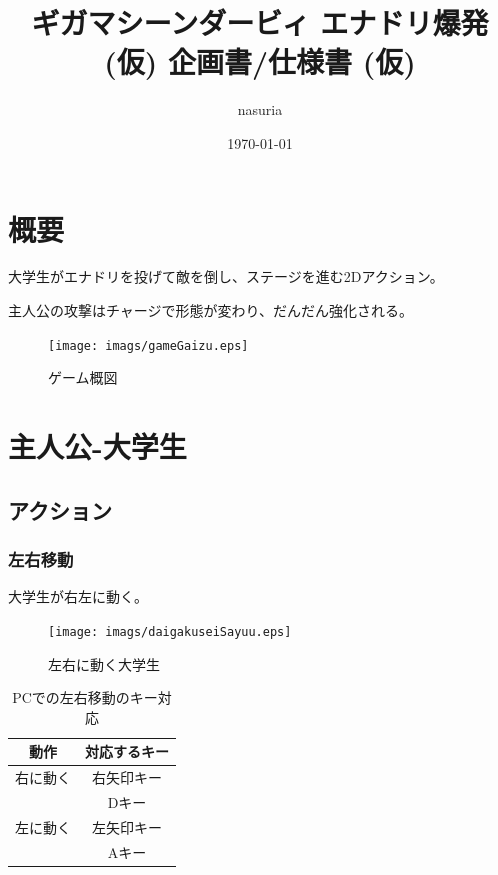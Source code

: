 \documentclass[12pt]{jsarticle}
\begin{document}
\title{
  ギガマシーンダービィ \linebreak{}
  エナドリ爆発 (仮) \linebreak{}
  企画書/仕様書 (仮)
}
\author{nasuria}
\date{\today}
\maketitle
\newpage

\tableofcontents
\newpage


\section{概要}
大学生がエナドリを投げて敵を倒し、ステージを進む2Dアクション。

主人公の攻撃はチャージで形態が変わり、だんだん強化される。

\begin{figure}[htbp]
  \begin{center}
    \texttt{[image: imags/gameGaizu.eps]}
    \caption{ゲーム概図}
  \end{center}
\end{figure}

\newpage

\section{主人公-大学生}
\subsection{アクション}
\subsubsection{左右移動}

大学生が右左に動く。

\begin{figure}[htbp]
  \begin{center}
    \texttt{[image: imags/daigakuseiSayuu.eps]}
    \caption{左右に動く大学生}
  \end{center}
\end{figure}

\begin{table}[htbp]
  \centering
  \caption{PCでの左右移動のキー対応}
  \begin{tabular}{cc}
    \toprule
    動作 & 対応するキー \\
    \midrule
    右に動く & 右矢印キー \\
      & Dキー \\
    \midrule
    左に動く & 左矢印キー \\
      & Aキー \\
    \midrule
  \end{tabular}
\end{table}
\end{document}
